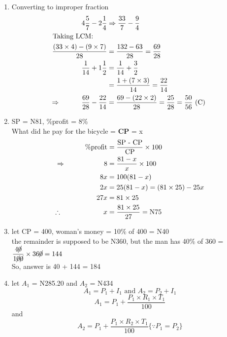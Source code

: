 \begin{multicols}{2}
\begin{enumerate}[label={\textbf{\arabic*.}}]
    \item Converting to improper fraction 
    \begin{align*}
        4\dfrac{5}{7} - 2\dfrac{1}{4} &\Rightarrow \dfrac{33}{7} - \dfrac{9}{4} \\
        \text{Taking LCM:} \hspace{20px}\\
        \dfrac{(33\times 4) - (9 \times 7) }{28} &= \dfrac{132 - 63}{28} = \dfrac{69}{28} \\
        \dfrac{1}{14} + 1\dfrac{1}{2} &= \dfrac{1}{14} + \dfrac{3}{2} \\
        &= \dfrac{1 + (7 \times 3)}{14} = \dfrac{22}{14} \\
        \Rightarrow \hspace{30px} \dfrac{69}{28} - \dfrac{22}{14} &= \dfrac{69 - (22 \times 2)}{28} =  \dfrac{25}{28} = \dfrac{50}{56} \text{ (C) }
    \end{align*}

    \item SP = N81, \%profit = 8\% \\
    What did he pay for the bicycle = \textbf{CP} = x \\
    \begin{align*}
    \%\text{profit} &= \dfrac{ \text{SP - CP}}{\text{CP}} \times 100  \\ 
    \Rightarrow \hspace{55px} 8 &= \dfrac{81 - x }{x} \times 100 \\
     \hspace{50px} 8x &= 100(81 - x)  \\
     \hspace{50px} 2x &= 25(81 - x ) = (81\times25) -25x \\
     \hspace{50px} 27x &= 81\times 25 \\
    \therefore \hspace{60px}  x &= \dfrac{81 \times 25}{27} = \text{N}75
    \end{align*}

    \item let CP = 400, woman's money = 10\% of 400 = N40 \\
    the remainder is supposed to be N360, but the man has 40\% of 360 = \(\dfrac{4\cancel{0}}{1\cancel{0}\cancel{0}} \times 36\cancel{0} = 144 \) \vspace {5px}\\
    So, answer is 40 + 144 = 184

    \item let $A_1$ = N285.20 and $A_2$ = N434 \\
       \[ A_1 = P_1 + I_1 \text{ and } A_2 =  P_2 + I_1 \] 
    \[A_1= P_1 + \dfrac{P_1 \times R_1 \times T_1}{100} \]  and \\
    \[A_2 = P_1 + \dfrac{P_1 \times R_2 \times T_1}{100} \{\because P_1 = P_2\} \]


\end{enumerate}
\end{multicols}
